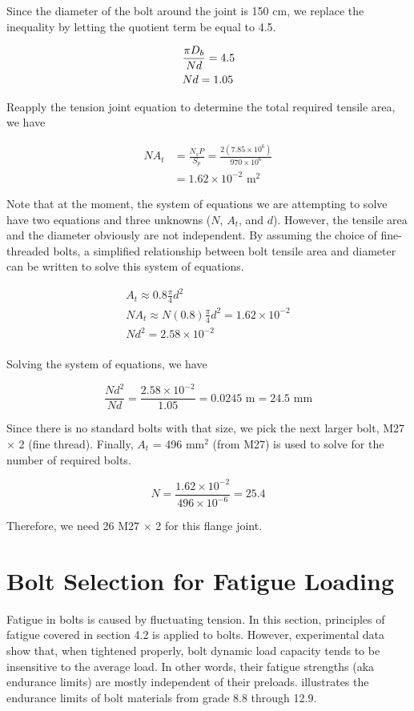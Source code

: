 \documentclass[a4paper,openany,12pt]{book}
\begin{document}
{{Since the diameter of the bolt around the joint is 150 cm, we replace
the inequality by letting the quotient term be equal to 4.5.

$$\begin{gathered}
  \frac{\pi D_b}{Nd} = 4.5 \hfill \\
  Nd = 1.05 \hfill \\ 
\end{gathered}$$

Reapply the tension joint equation to determine the total required
tensile area, we have

$$\begin{aligned}
  NA_t &= \frac{N_sP}{S_p} = \frac{2(7.85 \times 10^6)}{970 \times 10^6} \\
         &= 1.62 \times 10^{-2} \text{ m}^2\end{aligned}$$

Note that at the moment, the system of equations we are attempting to
solve have two equations and three unknowns (\(N\), \(A_t\), and \(d\)).
However, the tensile area and the diameter obviously are not
independent. By assuming the choice of fine-threaded bolts, a simplified
relationship between bolt tensile area and diameter can be written to
solve this system of equations.

$$\begin{gathered}
  A_t \approx 0.8\frac{\pi }{4}d^2 \\ 
  NA_t \approx N(0.8)\frac{\pi}{4}d^2 = 1.62 \times 10^{-2} \\ 
  Nd^2 = 2.58 \times 10^{-2} \\ 
\end{gathered}$$

Solving the system of equations, we have

$$\frac{Nd^2}{Nd} = \frac{2.58 \times 10^{-2}}{1.05} = 0.0245 \text{ m} = 24.5 \text{ mm}$$

Since there is no standard bolts with that size, we pick the next larger
bolt, M27 \(\times\) 2 (fine thread). Finally, \(A_t\) = 496 mm\(^2\) (from
M27) is used to solve for the number of required bolts.

$$N = \frac{1.62 \times 10^{-2}}{496 \times 10^{-6}} = 25.4$$

Therefore, we need 26 M27 \(\times\) 2 for this flange joint.

\section{Bolt Selection for Fatigue Loading}
\label{sec:orgd6a89a3}
Fatigue in bolts is caused by fluctuating tension. In this section,
principles of fatigue covered in section 4.2 is applied to bolts.
However, experimental data show that, when tightened properly, bolt
dynamic load capacity tends to be insensitive to the average load. In
other words, their fatigue strengths (aka endurance limits) are mostly
independent of their preloads. illustrates the endurance limits of bolt
materials from grade 8.8 through 12.9.


}}
\end{document}

